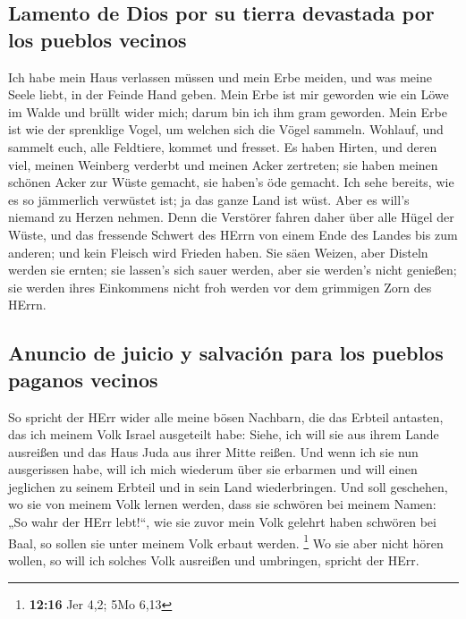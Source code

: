 \hypertarget{lamento-de-dios-por-su-tierra-devastada-por-los-pueblos-vecinos}{%
\subsection{Lamento de Dios por su tierra devastada por los pueblos
vecinos}\label{lamento-de-dios-por-su-tierra-devastada-por-los-pueblos-vecinos}}

 Ich habe mein Haus verlassen müssen und mein Erbe meiden,
und was meine Seele liebt, in der Feinde Hand geben.  Mein
Erbe ist mir geworden wie ein Löwe im Walde und brüllt wider mich; darum
bin ich ihm gram geworden.  Mein Erbe ist wie der
sprenklige Vogel, um welchen sich die Vögel sammeln. Wohlauf, und
sammelt euch, alle Feldtiere, kommet und fresset.  Es
haben Hirten, und deren viel, meinen Weinberg verderbt und meinen Acker
zertreten; sie haben meinen schönen Acker zur Wüste gemacht, sie haben's
öde gemacht.  Ich sehe bereits, wie es so jämmerlich
verwüstet ist; ja das ganze Land ist wüst. Aber es will's niemand zu
Herzen nehmen.  Denn die Verstörer fahren daher über alle
Hügel der Wüste, und das fressende Schwert des HErrn von einem Ende des
Landes bis zum anderen; und kein Fleisch wird Frieden haben.
 Sie säen Weizen, aber Disteln werden sie ernten; sie
lassen's sich sauer werden, aber sie werden's nicht genießen; sie werden
ihres Einkommens nicht froh werden vor dem grimmigen Zorn des HErrn.

\hypertarget{anuncio-de-juicio-y-salvaciuxf3n-para-los-pueblos-paganos-vecinos}{%
\subsection{Anuncio de juicio y salvación para los pueblos paganos
vecinos}\label{anuncio-de-juicio-y-salvaciuxf3n-para-los-pueblos-paganos-vecinos}}

 So spricht der HErr wider alle meine bösen Nachbarn, die
das Erbteil antasten, das ich meinem Volk Israel ausgeteilt habe: Siehe,
ich will sie aus ihrem Lande ausreißen und das Haus Juda aus ihrer Mitte
reißen.  Und wenn ich sie nun ausgerissen habe, will ich
mich wiederum über sie erbarmen und will einen jeglichen zu seinem
Erbteil und in sein Land wiederbringen.  Und soll
geschehen, wo sie von meinem Volk lernen werden, dass sie schwören bei
meinem Namen: „So wahr der HErr lebt!{}``, wie sie zuvor mein Volk
gelehrt haben schwören bei Baal, so sollen sie unter meinem Volk erbaut
werden. \footnote{\textbf{12:16} Jer 4,2; 5Mo 6,13}  Wo
sie aber nicht hören wollen, so will ich solches Volk ausreißen und
umbringen, spricht der HErr.

